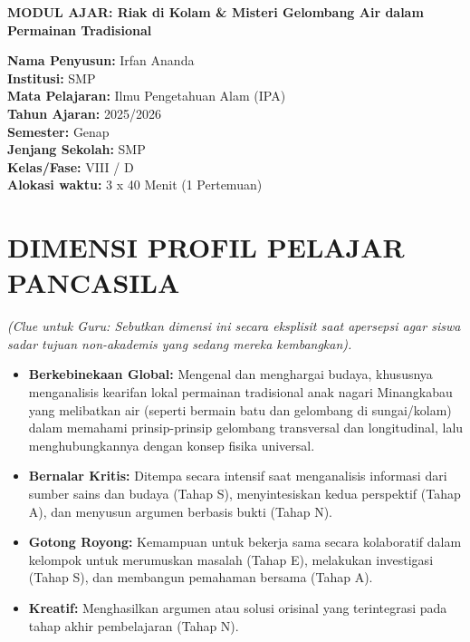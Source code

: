 \documentclass[12pt,a4paper]{article}
\begin{document}
\begin{center}
\textbf{\Large MODUL AJAR: Riak di Kolam \& Misteri Gelombang Air dalam Permainan Tradisional}
\end{center}

\vspace{0.5cm}

\begin{tcolorbox}[mystyle]
\textbf{Nama Penyusun:} Irfan Ananda \\
\textbf{Institusi:} SMP \\
\textbf{Mata Pelajaran:} Ilmu Pengetahuan Alam (IPA) \\
\textbf{Tahun Ajaran:} 2025/2026 \\
\textbf{Semester:} Genap \\
\textbf{Jenjang Sekolah:} SMP \\
\textbf{Kelas/Fase:} VIII / D \\
\textbf{Alokasi waktu:} 3 x 40 Menit (1 Pertemuan)
\end{tcolorbox}

\section{DIMENSI PROFIL PELAJAR PANCASILA}
\textit{(Clue untuk Guru: Sebutkan dimensi ini secara eksplisit saat apersepsi agar siswa sadar tujuan non-akademis yang sedang mereka kembangkan).}

\begin{itemize}
\item \textbf{Berkebinekaan Global:} Mengenal dan menghargai budaya, khususnya menganalisis kearifan lokal permainan tradisional anak nagari Minangkabau yang melibatkan air (seperti bermain batu dan gelombang di sungai/kolam) dalam memahami prinsip-prinsip gelombang transversal dan longitudinal, lalu menghubungkannya dengan konsep fisika universal.
\item \textbf{Bernalar Kritis:} Ditempa secara intensif saat menganalisis informasi dari sumber sains dan budaya (Tahap S), menyintesiskan kedua perspektif (Tahap A), dan menyusun argumen berbasis bukti (Tahap N).
\item \textbf{Gotong Royong:} Kemampuan untuk bekerja sama secara kolaboratif dalam kelompok untuk merumuskan masalah (Tahap E), melakukan investigasi (Tahap S), dan membangun pemahaman bersama (Tahap A).
\item \textbf{Kreatif:} Menghasilkan argumen atau solusi orisinal yang terintegrasi pada tahap akhir pembelajaran (Tahap N).
\end{itemize}
\end{document}
